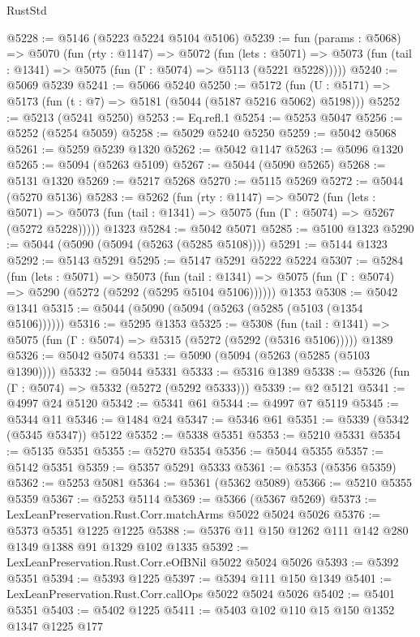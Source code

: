 \begin{lexlean}{RustStd}
\begin{coremodule}
@5228 := @5146 (@5223 @5224 @5104 @5106)
@5239 := fun (params : @5068) =>
  @5070
    (fun (rty : @1147) =>
    @5072
      (fun (lets : @5071) =>
      @5073 (fun (tail : @1341) => @5075 (fun (Γ : @5074) => @5113 (@5221 @5228)))))
@5240 := @5069 @5239
@5241 := @5066 @5240
@5250 := @5172 (fun (U : @5171) => @5173 (fun (t : @7) => @5181 (@5044 (@5187 @5216 @5062) @5198)))
@5252 := @5213 (@5241 @5250)
@5253 := Eq.refl.{1}
@5254 := @5253 @5047
@5256 := @5252 (@5254 @5059)
@5258 := @5029 @5240 @5250
@5259 := @5042 @5068
@5261 := @5259 @5239 @1320
@5262 := @5042 @1147
@5263 := @5096 @1320
@5265 := @5094 (@5263 @5109)
@5267 := @5044 (@5090 @5265)
@5268 := @5131 @1320
@5269 := @5217 @5268
@5270 := @5115 @5269
@5272 := @5044 (@5270 @5136)
@5283 := @5262
    (fun (rty : @1147) =>
    @5072
      (fun (lets : @5071) =>
      @5073 (fun (tail : @1341) => @5075 (fun (Γ : @5074) => @5267 (@5272 @5228)))))
    @1323
@5284 := @5042 @5071
@5285 := @5100 @1323
@5290 := @5044 (@5090 (@5094 (@5263 (@5285 @5108))))
@5291 := @5144 @1323
@5292 := @5143 @5291
@5295 := @5147 @5291 @5222 @5224
@5307 := @5284
    (fun (lets : @5071) =>
    @5073
      (fun (tail : @1341) => @5075 (fun (Γ : @5074) => @5290 (@5272 (@5292 (@5295 @5104 @5106))))))
    @1353
@5308 := @5042 @1341
@5315 := @5044 (@5090 (@5094 (@5263 (@5285 (@5103 (@1354 @5106))))))
@5316 := @5295 @1353
@5325 := @5308
    (fun (tail : @1341) => @5075 (fun (Γ : @5074) => @5315 (@5272 (@5292 (@5316 @5106)))))
    @1389
@5326 := @5042 @5074
@5331 := @5090 (@5094 (@5263 (@5285 (@5103 @1390))))
@5332 := @5044 @5331
@5333 := @5316 @1389
@5338 := @5326 (fun (Γ : @5074) => @5332 (@5272 (@5292 @5333)))
@5339 := @2 @5121
@5341 := @4997 @24 @5120
@5342 := @5341 @61
@5344 := @4997 @7 @5119
@5345 := @5344 @11
@5346 := @1484 @24
@5347 := @5346 @61
@5351 := @5339 (@5342 (@5345 @5347)) @5122
@5352 := @5338 @5351
@5353 := @5210 @5331
@5354 := @5135 @5351
@5355 := @5270 @5354
@5356 := @5044 @5355
@5357 := @5142 @5351
@5359 := @5357 @5291 @5333
@5361 := @5353 (@5356 @5359)
@5362 := @5253 @5081
@5364 := @5361 (@5362 @5089)
@5366 := @5210 @5355 @5359
@5367 := @5253 @5114
@5369 := @5366 (@5367 @5269)
@5373 := LexLeanPreservation.Rust.Corr.matchArms @5022 @5024 @5026
@5376 := @5373 @5351 @1225 @1225
@5388 := @5376 @11 @150 @1262 @111 @142 @280 @1349 @1388 @91 @1329 @102 @1335
@5392 := LexLeanPreservation.Rust.Corr.eOfBNil @5022 @5024 @5026
@5393 := @5392 @5351
@5394 := @5393 @1225
@5397 := @5394 @111 @150 @1349
@5401 := LexLeanPreservation.Rust.Corr.callOps @5022 @5024 @5026
@5402 := @5401 @5351
@5403 := @5402 @1225
@5411 := @5403 @102 @110 @15 @150 @1352 @1347 @1225 @177

\end{coremodule}
\end{lexlean}
